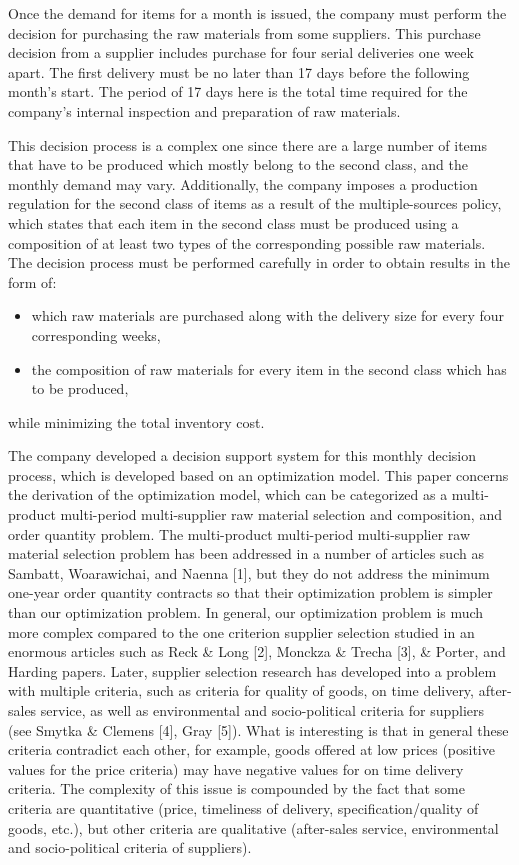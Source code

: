 \documentclass[preprint, 3p,
authoryear]{elsarticle} %
\providecommand{\tightlist}{%
  \setlength{\itemsep}{0pt}\setlength{\parskip}{0pt}}
\begin{document}
Once the demand for items for a month is issued, the company must
perform the decision for purchasing the raw materials from some
suppliers. This purchase decision from a supplier includes purchase for
four serial deliveries one week apart. The first delivery must be no
later than 17 days before the following month's start. The period of 17
days here is the total time required for the company's internal
inspection and preparation of raw materials.

This decision process is a complex one since there are a large number of
items that have to be produced which mostly belong to the second class,
and the monthly demand may vary. Additionally, the company imposes a
production regulation for the second class of items as a result of the
multiple-sources policy, which states that each item in the second class
must be produced using a composition of at least two types of the
corresponding possible raw materials. The decision process must be
performed carefully in order to obtain results in the form of:

\begin{itemize}
\tightlist
\item
  which raw materials are purchased along with the delivery size for
  every four corresponding weeks,
\item
  the composition of raw materials for every item in the second class
  which has to be produced,
\end{itemize}

while minimizing the total inventory cost.

The company developed a decision support system for this monthly
decision process, which is developed based on an optimization model.
This paper concerns the derivation of the optimization model, which can
be categorized as a multi-product multi-period multi-supplier raw
material selection and composition, and order quantity problem. The
multi-product multi-period multi-supplier raw material selection problem
has been addressed in a number of articles such as Sambatt, Woarawichai,
and Naenna {[}1{]}, but they do not address the minimum one-year order
quantity contracts so that their optimization problem is simpler than
our optimization problem. In general, our optimization problem is much
more complex compared to the one criterion supplier selection studied in
an enormous articles such as Reck \& Long {[}2{]}, Monckza \& Trecha
{[}3{]}, \& Porter, and Harding papers. Later, supplier selection
research has developed into a problem with multiple criteria, such as
criteria for quality of goods, on time delivery, after-sales service, as
well as environmental and socio-political criteria for suppliers (see
Smytka \& Clemens {[}4{]}, Gray {[}5{]}). What is interesting is that in
general these criteria contradict each other, for example, goods offered
at low prices (positive values for the price criteria) may have negative
values for on time delivery criteria. The complexity of this issue is
compounded by the fact that some criteria are quantitative (price,
timeliness of delivery, specification/quality of goods, etc.), but other
criteria are qualitative (after-sales service, environmental and
socio-political criteria of suppliers).
\end{document}
